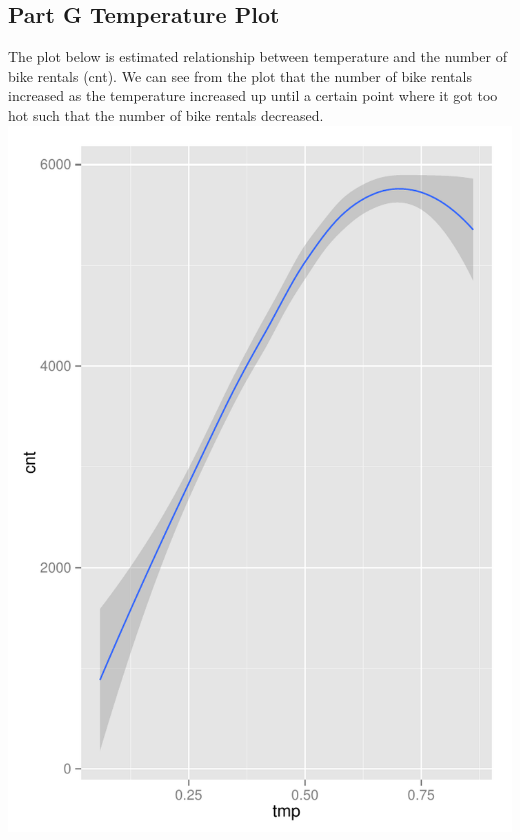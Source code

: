\documentclass[11pt]{article}
\begin{document}
\subsection{Part G Temperature Plot}
\label{subsec:problem2gplotsTemp}
The plot below is estimated relationship between temperature and the number of bike rentals (cnt). We can see from the plot that the number of bike rentals increased as the temperature increased up until a certain point where it got too hot such that the number of bike rentals decreased. \newline 
\includegraphics{Problem2G-Temp.pdf}
\pagebreak
\end{document}
